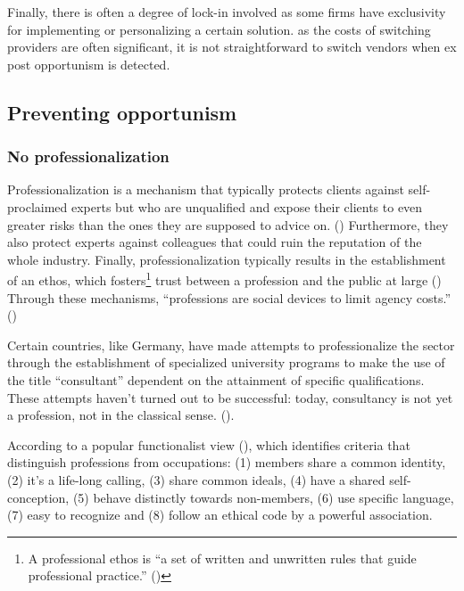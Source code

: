 \documentclass[
  man,floatsintext]{apa6}
\begin{document}
Finally, there is often a degree of lock-in involved as some firms have exclusivity for implementing or personalizing a certain solution. as the costs of switching providers are often significant, it is not straightforward to switch vendors when ex post opportunism is detected.

\subsection{Preventing opportunism}\label{preventing-opportunism}

\subsubsection{No professionalization}\label{no-professionalization}

Professionalization is a mechanism that typically protects clients against self-proclaimed experts but who are unqualified and expose their clients to even greater risks than the ones they are supposed to advice on. () Furthermore, they also protect experts against colleagues that could ruin the reputation of the whole industry. Finally, professionalization typically results in the establishment of an ethos, which fosters\footnote{A professional ethos is ``a set of written and unwritten rules that guide professional practice.'' ()} trust between a profession and the public at large () Through these mechanisms, ``professions are social devices to limit agency costs.'' ()

Certain countries, like Germany, have made attempts to professionalize the sector through the establishment of specialized university programs to make the use of the title ``consultant'' dependent on the attainment of specific qualifications. These attempts haven't turned out to be successful: today, consultancy is not yet a profession, not in the classical sense. ().

According to a popular functionalist view (), which identifies criteria that distinguish professions from occupations: (1) members share a common identity, (2) it's a life-long calling, (3) share common ideals, (4) have a shared self-conception, (5) behave distinctly towards non-members, (6) use specific language, (7) easy to recognize and (8) follow an ethical code by a powerful association.
\end{document}
